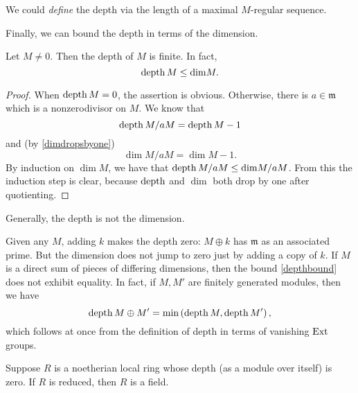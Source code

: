 \begin{remark}
We could \emph{define} the depth via the length of a maximal
$M$-regular sequence.
\end{remark}

Finally, we can bound the depth in terms of the dimension. 

\begin{corollary}\label{depthboundlocal} Let $M \neq 0$. Then the depth of $M$ is finite. In fact,
\begin{equation} \label{depthbound} \operatorname{depth} M \leq \mathrm{dim} M.  \end{equation}
\end{corollary}
\begin{proof}
When $\operatorname{depth} M = 0$, the assertion is obvious.
Otherwise,
there is $ a \in \mathfrak{m}$ which is a nonzerodivisor on $M$.
We know that
\[ \operatorname{depth} M/aM = \operatorname{depth} M -1  \]
and (by \cref{dimdropsbyone})
\[ \dim  M/aM = \dim  M -1.  \]
By induction on $\dim M$, we have that $\operatorname{depth} M/aM \leq \mathrm{dim} M/aM$.
From this the
induction step is clear, because $\operatorname{depth}$ and $\dim$ both drop by one after
quotienting.
\end{proof}

Generally, the depth is not the dimension.
\begin{example}
Given any $M$, adding $k$ makes the depth zero: $M \oplus k$
has $\mathfrak{m}$ as an associated prime. But the dimension
 does not
jump to zero just by adding a copy of $k$. If $M$ is a direct sum of pieces of
differing dimensions, then the bound \eqref{depthbound} does not exhibit
equality.
In fact, if $M, M'$ are finitely generated modules, then we have
\[ \operatorname{depth} M \oplus M' = \min \left(\operatorname{depth} M, \operatorname{depth} M' \right),  \]
which follows at once from the definition of depth in terms of
vanishing $\operatorname{Ext}$ groups.
\end{example}

\begin{exercise} 
Suppose $R$ is a noetherian local ring whose depth (as a module over itself)
is zero. If $R$ is reduced, then $R$ is a field. 
\end{exercise} 

